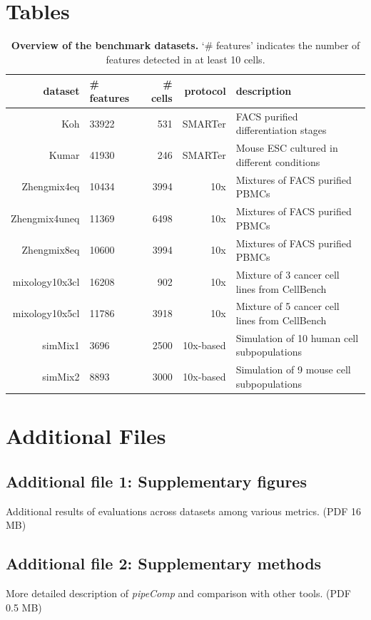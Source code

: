 \documentclass{bmcart}
\begin{document}
\begin{backmatter}

\section*{Tables}

\begin{table}[h!]
\caption{\textbf{Overview of the benchmark datasets.} `\# features' indicates the number of features detected in at least 10 cells.}
\label{tab:table1}
\begin{tabular}{rlrrl}
  \hline
dataset & \# features & \# cells & protocol & description \\ 
  \hline
Koh & 33922 & 531 & SMARTer & FACS purified differentiation stages \\ 
  Kumar & 41930 & 246 & SMARTer & Mouse ESC cultured in different conditions \\ 
  Zhengmix4eq & 10434 & 3994 & 10x & Mixtures of FACS purified PBMCs \\ 
  Zhengmix4uneq & 11369 & 6498 & 10x & Mixtures of FACS purified PBMCs \\ 
  Zhengmix8eq & 10600 & 3994 & 10x & Mixtures of FACS purified PBMCs \\ 
  mixology10x3cl & 16208 & 902 & 10x & Mixture of 3  cancer cell lines from CellBench \\ 
  mixology10x5cl & 11786 & 3918 & 10x & Mixture of 5 cancer cell lines from CellBench \\ 
  simMix1 & 3696 & 2500 & 10x-based & Simulation of 10 human cell subpopulations \\
  simMix2 & 8893 & 3000 & 10x-based & Simulation of 9 mouse cell subpopulations \\
   \hline
\end{tabular}
\end{table}



\section*{Additional Files}
  \subsection*{\textbf{Additional file 1: Supplementary figures}}
  Additional results of evaluations across datasets among various metrics. (PDF 16 MB)
  \subsection*{\textbf{Additional file 2: Supplementary methods}}
  More detailed description of \textit{pipeComp} and comparison with other tools. (PDF 0.5 MB)
\end{backmatter}
\end{document}

